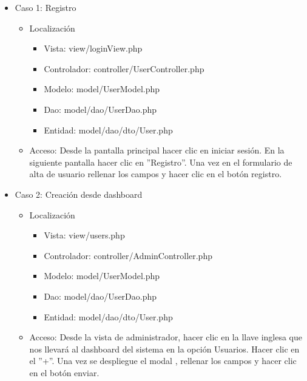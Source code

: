 \begin{itemize}
\item Caso 1: Registro
\begin{itemize}
\item Localizaci\'{o}n
\begin{itemize}
\item Vista: view/loginView.php
\item Controlador: controller/UserController.php
\item Modelo: model/UserModel.php
\item Dao: model/dao/UserDao.php
\item Entidad: model/dao/dto/User.php
\end{itemize}
\item Acceso: Desde la pantalla principal hacer clic en iniciar sesi\'{o}n. En la siguiente pantalla hacer clic en ''Registro''. Una vez en el formulario de alta de usuario rellenar los campos y hacer clic en el bot\'{o}n registro.
\end{itemize}

\item Caso 2: Creaci\'{o}n desde dashboard
\begin{itemize}
\item Localizaci\'{o}n
\begin{itemize}
\item Vista: view/users.php
\item Controlador: controller/AdminController.php
\item Modelo: model/UserModel.php
\item Dao: model/dao/UserDao.php
\item Entidad: model/dao/dto/User.php
\end{itemize}
\item Acceso: Desde la vista de administrador, hacer clic en la llave inglesa que nos llevar\'{a} al dashboard del sistema en la opci\'{o}n Usuarios. Hacer clic en el ''+''. Una vez se despliegue el modal , rellenar los campos y hacer clic en el bot\'{o}n enviar.
\end{itemize}
\end{itemize}

